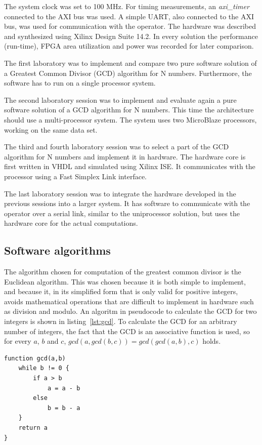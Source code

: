 \documentclass[11pt]{article}
\begin{document}
The system clock was set to 100 MHz. For timing measurements, an \emph{axi\_timer}\cite{axi-timer} connected to the AXI bus was used. A simple UART, also connected to the AXI bus, was used for communication with the operator. The hardware was described and synthesized using Xilinx Design Suite 14.2. In every solution the performance (run-time), FPGA area utilization and power was recorded for later comparison.

The first laboratory was to implement and compare two pure software solution of a Greatest Common Divisor (GCD) algorithm for N numbers. Furthermore, the software has to run on a single processor system.

The second laboratory session was to implement and evaluate again a pure software solution of a GCD algorithm for N numbers. This time the architecture should use a multi-processor system. The system uses two MicroBlaze processors, working on the same data set.

The third and fourth laboratory session was to select a part of the GCD algorithm for N numbers and implement it in hardware. The hardware core is first written in VHDL and simulated using Xilinx ISE. It communicates with the processor using a Fast Simplex Link interface\cite{fsl}.

The last laboratory session was to integrate the hardware developed in the previous sessions into a larger system. It has software to communicate with the operator over a serial link, similar to the uniprocessor solution, but uses the hardware core for the actual computations.

\subsection{Software algorithms}
The algorithm chosen for computation of the greatest common divisor is the Euclidean algorithm. This was chosen because it is both simple to implement, and because it, in its simplified form that is only valid for positive integers, avoids mathematical operations that are difficult to implement in hardware such as division and modulo. An algoritm in pseudocode to calculate the GCD for two integers\cite[pp. 318-320]{knuth} is shown in listing~\ref{lst:gcd}. To calculate the GCD for an arbitrary number of integers, the fact that the GCD is an associative function is used, so for every $a$, $b$ and $c$, $gcd(a, gcd(b, c)) = gcd(gcd(a, b), c)$ holds.

\begin{lstlisting}[float=tbh,frame=tb,captionpos=b,caption={Euclidean subtracion algorithm},label=lst:gcd]
function gcd(a,b)
	while b != 0 {
		if a > b
			a = a - b
		else
			b = b - a
	}
	return a
}
\end{lstlisting}
\end{document}
